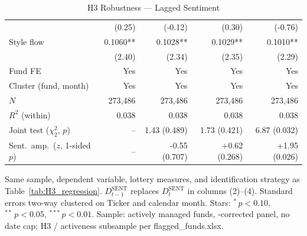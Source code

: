\begin{table}[!htbp]
{\begin{tabular*}{\linewidth}{@{\extracolsep{\fill}}lrrrr}
 & (0.25) & (-0.12) & (0.30) & (-0.76)\\
Style flow & 0.1060** & 0.1028** & 0.1029** & 0.1010**\\
 & (2.40) & (2.34) & (2.35) & (2.29)\\
\midrule
Fund FE & Yes & Yes & Yes & Yes\\
Cluster (fund, month) & Yes & Yes & Yes & Yes\\
$N$ & 273,486 & 273,486 & 273,486 & 273,486\\
$R^2$ (within) & 0.038 & 0.038 & 0.038 & 0.038\\
Joint test ($\chi^2_2$, $p$) & -- & 1.43 (0.489) & 1.73 (0.421) & 6.87 (0.032)\\
Sent.\ amp.\ ($z$, 1-sided $p$) & -- & -0.55 (0.707) & +0.62 (0.268) & +1.95 (0.026)\\
\bottomrule
\end{tabular*}%
}\sbefit
\fi
\setlength{\tabletempwidth}{\wd\tabletempbox}
\ifdim\tabletempwidth>\linewidth\setlength{\tabletempwidth}{\linewidth}\fi
\begin{minipage}{\tabletempwidth}
\captionsetup{width=\linewidth}
\caption{H3 Robustness --- Lagged Sentiment}\label{tab:H3_lagged}
\ifdim\wd\tabletempbox>\linewidth
  \resizebox{\linewidth}{!}{\usebox{\tabletempbox}}
\else
  \usebox{\tabletempbox}
\fi
\par\medskip
\begin{singlespace}\tablefont\noindent
Same sample, dependent variable, lottery measures, and identification strategy as Table~\ref{tab:H3_regression}. $D^{\text{SENT}}_{t-1}$ replaces $D^{\text{SENT}}_{t}$ in columns (2)--(4). Standard errors two-way clustered on Ticker and calendar month. Stars: $^{*}\,p<0.10$, $^{**}\,p<0.05$, $^{***}\,p<0.01$. Sample: actively managed funds, \textcite{Evans2010}-corrected panel, no date cap; H3 / activeness subsample per flagged\_funds.xlsx.
\end{singlespace}
\end{minipage}
\end{table}

